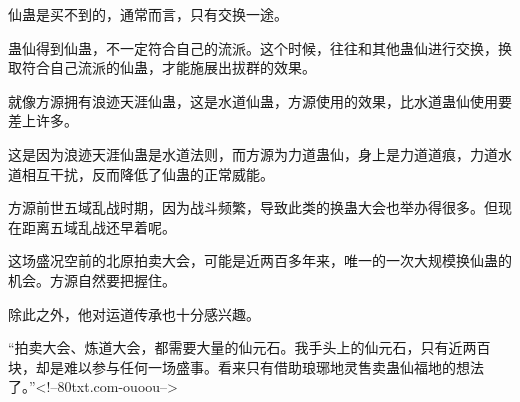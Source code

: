 \begin{this_body}
仙蛊是买不到的，通常而言，只有交换一途。

蛊仙得到仙蛊，不一定符合自己的流派。这个时候，往往和其他蛊仙进行交换，换取符合自己流派的仙蛊，才能施展出拔群的效果。

就像方源拥有浪迹天涯仙蛊，这是水道仙蛊，方源使用的效果，比水道蛊仙使用要差上许多。

这是因为浪迹天涯仙蛊是水道法则，而方源为力道蛊仙，身上是力道道痕，力道水道相互干扰，反而降低了仙蛊的正常威能。

方源前世五域乱战时期，因为战斗频繁，导致此类的换蛊大会也举办得很多。但现在距离五域乱战还早着呢。

这场盛况空前的北原拍卖大会，可能是近两百多年来，唯一的一次大规模换仙蛊的机会。方源自然要把握住。

除此之外，他对运道传承也十分感兴趣。

“拍卖大会、炼道大会，都需要大量的仙元石。我手头上的仙元石，只有近两百块，却是难以参与任何一场盛事。看来只有借助琅琊地灵售卖蛊仙福地的想法了。”<!--80txt.com-ouoou-->

\end{this_body}

